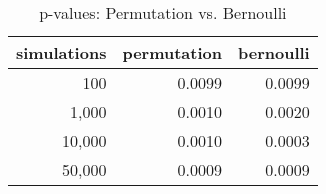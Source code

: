 \begin{table}[h]
    \centering
    \begin{tabular}[t]{rrr}
        \toprule
        simulations & permutation & bernoulli\\
        \midrule
        100 & 0.0099 & 0.0099\\
        1,000 & 0.0010 & 0.0020\\
        10,000 & 0.0010 & 0.0003\\
        50,000 & 0.0009 & 0.0009\\
        \bottomrule
    \end{tabular}
    \caption{\label{tab:tab:2asimulations}p-values: Permutation vs. Bernoulli}
    \label{tab:2asimulations}
\end{table}
